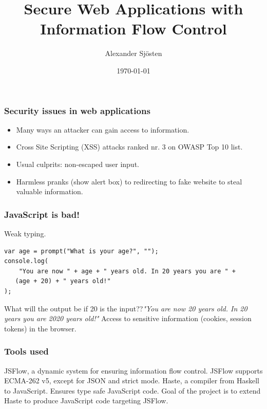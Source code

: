 \documentclass{beamer}
\title[SWAP-IFC]{Secure Web Applications with Information Flow Control}
\author{Alexander Sjösten}
\institute[GU]
{
Master's Thesis in Computer Science \\
\medskip
Examiner: Andrei Sabelfeld 
}
\date{\today}
\begin{document}
\begin{frame}
\titlepage
\end{frame}


\begin{frame}
  \frametitle{Security issues in web applications}
  \begin{itemize}
    \item Many ways an attacker can gain access to information. \pause
    \item Cross Site Scripting (XSS) attacks ranked nr. 3 on OWASP Top 10 list. \pause
    \item Usual culprits: non-escaped user input. \pause
    \item Harmless pranks (show alert box) to redirecting to fake website to steal valuable information.
  \end{itemize}
\end{frame}


\begin{frame}[fragile]
  \frametitle{JavaScript is bad!}
  Weak typing.
  \begin{block}{}
\begin{verbatim}
var age = prompt("What is your age?", "");
console.log(
    "You are now " + age + " years old. In 20 years you are " +
   (age + 20) + " years old!"
);
\end{verbatim}
  \end{block}
  What will the output be if 20 is the input??\pause \emph{"You are now 20 years old. In 20 years you are 2020 years old!"}
  \pause
  \newline
  Access to sensitive information (cookies, session tokens) in the browser. \pause
  
\end{frame}


\begin{frame}
  \frametitle{Tools used}
  JSFlow, a dynamic system for ensuring information flow control. \pause
  \newline
  JSFlow supports ECMA-262 v5, except for JSON and strict mode. \pause
  \newline
  \newline
  Haste, a compiler from Haskell to JavaScript. \pause
  \newline
  Ensures type safe JavaScript code. \pause
  \newline
  \newline
  Goal of the project is to extend Haste to produce JavaScript code targeting JSFlow.
\end{frame}
\end{document}
